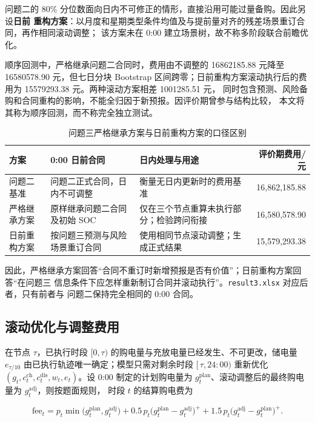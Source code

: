 \documentclass[withoutpreface,bwprint]{cumcmthesis}
\begin{document}
问题二的 80\% 分位数面向日内不可修正的情形，直接沿用可能过量备购。因此另设\textbf{日前
重构方案}：以月度和星期类型条件均值及与提前量对齐的残差场景重订合同，再作相同滚动调整；
该方案未在 0:00 建立场景树，故不称多阶段联合前瞻优化。

顺序回测中，严格继承问题二合同时，费用由不调整的 \num{16862185.88} 元降至
\num{16580578.90} 元，但七日分块 Bootstrap 区间跨零；日前重构方案滚动执行后的费用为
\num{15579293.38} 元。两种滚动方案相差 \num{1001285.51} 元，
同时包含预测、风险备购和合同重构的影响，不能全归因于新预报。因评价期曾参与结构比较，
本文将其称为顺序回测，而不称完全独立测试。

\begin{table}[H]
  \centering
  \caption{问题三严格继承方案与日前重构方案的口径区别}
  \label{tab:q3-linkage}
  \small
  \begin{tabular}{p{2.4cm}p{4.5cm}p{4.7cm}r}
    \toprule
    方案 & 0:00 日前合同 & 日内处理与用途 & 评价期费用/元 \\
    \midrule
    问题二基准 & 问题二正式合同，日内不可调整 & 衡量无日内更新时的费用基准 & 16,862,185.88 \\
    严格继承方案 & 原样继承问题二合同及初始 SOC & 仅在三个节点重算未执行部分；检验跨问衔接 & 16,580,578.90 \\
    日前重构方案 & 按问题三预测与风险场景重订合同 & 使用相同节点滚动调整；生成正式结果 & 15,579,293.38 \\
    \bottomrule
  \end{tabular}
\end{table}

因此，严格继承方案回答“合同不重订时新增预报是否有价值”；日前重构方案回答“在问题三
信息条件下应怎样重新制订合同并滚动执行”。\texttt{result3.xlsx} 对应后者，只有前者与
问题二保持完全相同的 0:00 合同。

\subsection{滚动优化与调整费用}

在节点 $\tau$，已执行时段 $[0,\tau)$ 的购电量与充放电量已经发生、不可更改，储电量
$e_{\tau/10}$ 由已执行轨迹唯一确定；模型只需对剩余时段 $[\,\tau,24{:}00)$ 重新优化
$(g_t,c_t^{\mathrm{ch}},c_t^{\mathrm{dis}},w_t,e_t)$。设 0:00 制定的计划购电量为
$g^{\mathrm{plan}}_t$、滚动调整后的最终购电量为 $g^{\mathrm{adj}}_t$，则按题面规则，
时段 $t$ 的结算购电费为

\begin{equation}
  \mathrm{fee}_t=p_t\min\big(g^{\mathrm{plan}}_t,g^{\mathrm{adj}}_t\big)
  +0.5\,p_t\big(g^{\mathrm{plan}}_t-g^{\mathrm{adj}}_t\big)^{+}
  +1.5\,p_t\big(g^{\mathrm{adj}}_t-g^{\mathrm{plan}}_t\big)^{+}.
  \label{eq:q3-fee}
\end{equation}
\end{document}
